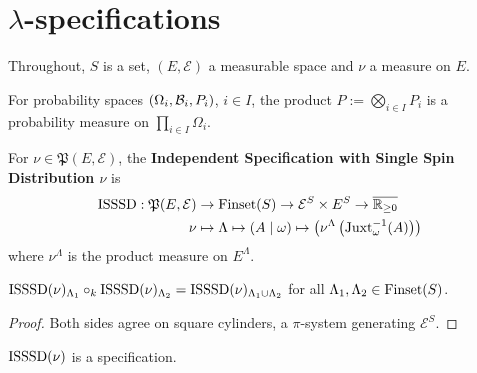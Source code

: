 \section{\texorpdfstring{$\lambda$}{Lambda}-specifications}

Throughout, $S$ is a set, $(E, \mathcal{E})$ a measurable space and $\nu$ a measure on $E$.

\begin{definition}
    \label{def:product-probability-measure}
    \leanok{}

    For probability spaces $(\Omega_i,\mathcal{B}_i,P_i)$, $i \in I$, the product
    $P:=\bigotimes_{i\in I}P_i$ is a probability measure on $\prod_{i\in I}\Omega_i$.
\end{definition}

\begin{definition}
    \label{def:isssd}

    For $\nu \in \mathfrak{P}(E, \mathcal{E})$, the \textbf{Independent Specification with Single
    Spin Distribution $\nu$} is
    \begin{align}
        \operatorname{ISSSD}:\mathfrak{P}(E, \mathcal{E})&\to\operatorname{Finset}(S)\to\mathcal{E}^S\times E^S\to\overline{\mathbb{R}_{\geq0}}\\
        \nu&\mapsto\Lambda\mapsto(A\mid\omega)\mapsto\left(\nu^\Lambda\left(\operatorname{Juxt}_{\omega}^{-1}(A)\right)\right)
    \end{align}
    where $\nu^\Lambda$ is the product measure on $E^\Lambda$.
\end{definition}

\begin{lemma}
    \label{lem:isssd-indep}
    \leanok{}

    $\operatorname{ISSSD}(\nu)_{\Lambda_1} \circ_k \operatorname{ISSSD}(\nu)_{\Lambda_2} = \operatorname{ISSSD}(\nu)_{\Lambda_1 \cup \Lambda_2}$
    for all $\Lambda_1, \Lambda_2 \in \operatorname{Finset}(S)$.
\end{lemma}
\begin{proof}

    Both sides agree on square cylinders, a $\pi$-system generating $\mathcal{E}^S$.
\end{proof}


\begin{definition}
    \label{def:isssd-spec}
    \leanok

    $\operatorname{ISSSD}(\nu)$ is a specification.
\end{definition}

